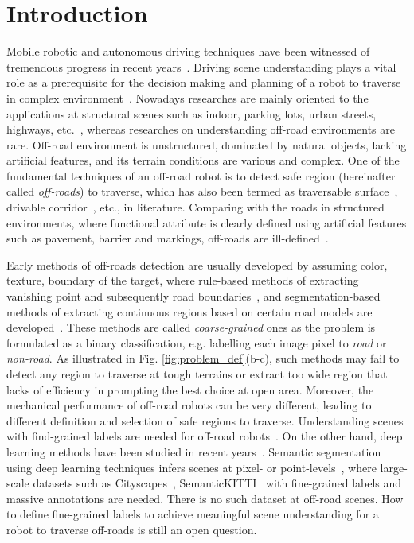 \documentclass[letterpaper, 10 pt, conference]{ieeeconf}  %
\begin{document}
\section{Introduction}
Mobile robotic and autonomous driving techniques have been witnessed of tremendous progress in recent years~\cite{feng2020deep}. Driving scene understanding plays a vital role as a prerequisite for the decision making and planning of a robot to traverse in complex environment~\cite{badue2020self}.
Nowadays researches are mainly oriented to the applications at structural scenes such as indoor, parking lots, urban streets, highways, etc.~\cite{siam2017deep},
whereas researches on understanding off-road environments are rare.
Off-road environment is unstructured, dominated by natural objects, lacking artificial features, and its terrain conditions are various and complex.
One of the fundamental techniques of an off-road robot is to detect safe region (hereinafter called {\it off-roads}) to traverse, which has also been termed as traversable surface~\cite{zhou2012self}, drivable corridor~\cite{nefian2006detection}, etc., in literature.
Comparing with the roads in structured environments, where functional attribute is clearly defined using artificial features such as pavement, barrier and markings,
off-roads are ill-defined~\cite{ososinski2015automatic}. 

Early methods of off-roads detection are usually developed by assuming color, texture, boundary of the target, where rule-based methods of extracting vanishing point and subsequently road boundaries~\cite{kong2009vanishing}\cite{shi2015fast}, and segmentation-based methods of extracting continuous regions based on certain road models are developed~\cite{alon2006off}\cite{wang2009unstructured}.
These methods are called {\it coarse-grained} ones as the problem is formulated as a binary classification, e.g. labelling each image pixel to {\it road} or {\it non-road}.
As illustrated in Fig. \ref{fig:problem_def}(b-c), such methods may fail to detect any region to traverse at tough terrains or extract too wide region that lacks of efficiency in prompting the best choice at open area.
Moreover, the mechanical performance of off-road robots can be very different, leading to different definition and selection of safe regions to traverse.
Understanding scenes with find-grained labels are needed for off-road robots~\cite{wellhausen2019should}.
On the other hand, deep learning methods have been studied in recent years~\cite{rateke2019passive}. 
Semantic segmentation using deep learning techniques infers scenes at pixel- or point-levels~\cite{long2015fully}, where large-scale datasets such as Cityscapes~\cite{cordts2016cityscapes}, SemanticKITTI~\cite{behley2019semantickitti} with fine-grained labels and massive annotations are needed.
There is no such dataset at off-road scenes. How to define fine-grained labels to achieve meaningful scene understanding for a robot to traverse off-roads is still an open question.  
\end{document}
